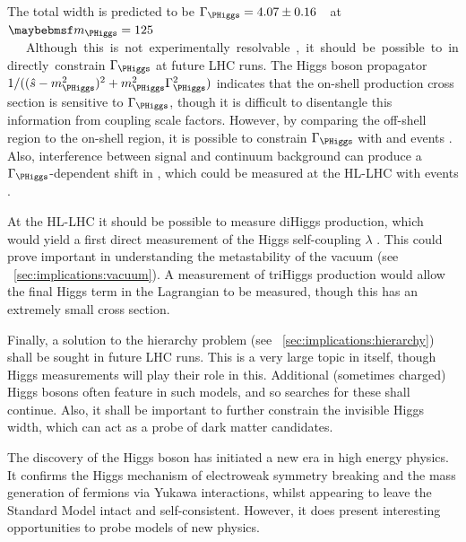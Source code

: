 The total width is predicted to be \unit{$\Gamma_{\PHiggs} = 4.07 \pm 0.16$}{\MeV} at 
\unit{$\mH = 125$}{\GeV} \cite{YR3}. Although this is not experimentally resolvable, it 
should be possible to indirectly constrain $\Gamma_{\PHiggs}$ at future LHC runs.
The Higgs boson propagator 
$1/((\hat{s} - m_{\PHiggs}^2)^2 + m_{\PHiggs}^2\Gamma_{\PHiggs}^2)$ 
indicates that the on-shell production cross section is sensitive to $\Gamma_{\PHiggs}$, 
though it is difficult to disentangle this information from coupling scale factors. 
However, by comparing the off-shell region to the on-shell region, it is possible to 
constrain $\Gamma_{\PHiggs}$ with \HepProcess{\PHiggs \HepTo \PZ\PZ} and \HWW events 
\cite{Caola:2013,Campbell:2013HZZ,Campbell:2013HWW}.
Also, interference between signal and continuum background can produce a 
$\Gamma_{\PHiggs}$-dependent shift in \mH, which could be measured at the HL-LHC with 
\HepProcess{\PHiggs \HepTo \Pphoton\Pphoton} events \cite{Dixon:2013,Martin:2013}.

At the HL-LHC it should be possible to measure diHiggs production, which would yield a 
first direct measurement of the Higgs self-coupling $\lambda$ \cite{DiHiggs}. This could 
prove important in understanding the metastability of the vacuum (see 
\Section~\ref{sec:implications:vacuum}). A measurement of triHiggs production would allow 
the final Higgs term in the Lagrangian to be measured, though this has an extremely small 
cross section.

Finally, a solution to the hierarchy problem (see 
\Section~\ref{sec:implications:hierarchy}) shall be sought in future LHC runs. This is a 
very large topic in itself, though Higgs measurements will play their role in this. 
Additional (sometimes charged) Higgs bosons often feature in such models, and so searches 
for these shall continue. Also, it shall be important to further constrain the invisible 
Higgs width, which can act as a probe of dark matter candidates.

The discovery of the Higgs boson has initiated a new era in high energy physics. It 
confirms the Higgs mechanism of electroweak symmetry breaking and the mass generation of 
fermions via Yukawa interactions, whilst appearing to leave the Standard Model intact and 
self-consistent. However, it does present interesting opportunities to probe models of new 
physics.


